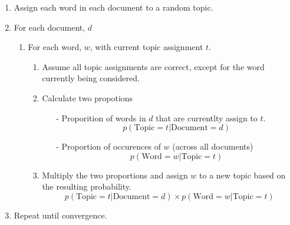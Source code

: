 \documentclass[11pt,a4paper]{article}
\begin{document}
\begin{enumerate}[label=\arabic*)]
	\item Assign each word in each document to a random topic.
	\item For each document, $d$
	\begin{enumerate}
		\item For each word, $w$, with current topic assignment $t$.
		\begin{enumerate}
			\item Assume all topic assignments are correct, except for the word currently being considered.
			\item Calculate two propotions
			\begin{itemize}
				\item[-] Proporition of words in $d$ that are currentlty assign to $t$. $$p(\text{Topic}=t|\text{Document}=d)$$
				\item[-] Proportion of occurences of $w$ (across all documents)  $$p(\text{Word}=w|\text{Topic}=t)$$
			\end{itemize}
			\item Multiply the two proportions and assign $w$ to a new topic based on the resulting probability.
			$$p(\text{Topic}=t|\text{Document}=d)\times p(\text{Word}=w|\text{Topic}=t)$$
		\end{enumerate}
	\end{enumerate}
	\item Repeat until convergence.
\end{enumerate}
\end{document}
